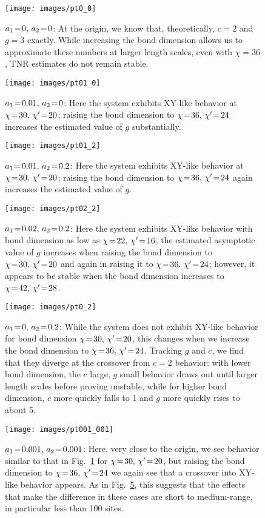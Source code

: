 \documentclass[aps,prb,letterpaper,superscriptaddress,twocolumn,showpacs,floatfix,10pt]{revtex4-1}
\begin{document}
\begin{figure}
\texttt{[image: images/pt0\_0]}
\caption{$a_1\nobreak\!=\nobreak\!0, \,a_2\nobreak\!=\nobreak\!0$: At the origin, we know that, theoretically,
$c=2$ and $g=3$
exactly. While increasing the bond dimension allows us to approximate these
numbers at larger length scales, even with $\chi=36$, TNR
estimates do not remain stable.}
\label{fig:comp0_0}
\end{figure}
\begin{figure}
\texttt{[image: images/pt01\_0]}
\caption{$a_1\nobreak\!=\nobreak\!0.01, \,a_2\nobreak\!=\nobreak\!0$: Here the system exhibits XY-like behavior at
$\chi\nobreak\!=\nobreak\!30, \,\chi'\nobreak\!=\nobreak\!20$; raising the bond dimension to $\chi\nobreak\!=\nobreak\!36, \,\chi'\nobreak\!=\nobreak\!24$ increases
the estimated value of $g$ substantially.}
\label{fig:comp01_0}
\end{figure}
\begin{figure}
\texttt{[image: images/pt01\_2]}
\caption{$a_1\nobreak\!=\nobreak\!0.01, \,a_2\nobreak\!=\nobreak\!0.2$: Here the system exhibits XY-like behavior at
$\chi\nobreak\!=\nobreak\!30, \,\chi'\nobreak\!=\nobreak\!20$; raising the bond dimension to $\chi\nobreak\!=\nobreak\!36, \,\chi'\nobreak\!=\nobreak\!24$ again
increases the estimated value of $g$.}
\label{fig:comp01_2}
\end{figure}
\begin{figure}
\texttt{[image: images/pt02\_2]}
\caption{$a_1\nobreak\!=\nobreak\!0.02, \,a_2\nobreak\!=\nobreak\!0.2$: Here the system exhibits XY-like behavior with
bond dimension as low as $\chi\nobreak\!=\nobreak\!22, \,\chi'\nobreak\!=\nobreak\!16$; the estimated asymptotic value
of $g$ increases when raising the bond dimension to $\chi\nobreak\!=\nobreak\!30, \,\chi'\nobreak\!=\nobreak\!20$ and again
in raising it to $\chi\nobreak\!=\nobreak\!36, \,\chi'\nobreak\!=\nobreak\!24$; however, it appears to be stable when the
bond dimension increases to $\chi\nobreak\!=\nobreak\!42, \,\chi'\nobreak\!=\nobreak\!28$.}
\label{fig:comp02_2}
\end{figure}
\begin{figure}
\texttt{[image: images/pt0\_2]}
\caption{$a_1\nobreak\!=\nobreak\!0, \,a_2\nobreak\!=\nobreak\!0.2$: While the system does not exhibit XY-like behavior
for bond dimension $\chi\nobreak\!=\nobreak\!30, \,\chi'\nobreak\!=\nobreak\!20$, this changes when we increase the bond
dimension to $\chi\nobreak\!=\nobreak\!36, \,\chi'\nobreak\!=\nobreak\!24$. Tracking $g$ and $c$, we find that they
diverge at the crossover from $c=2$ behavior: with lower bond dimension, the
$c$ large, $g$ small behavior draws out until larger length scales before
proving unstable, while for higher bond dimension, $c$ more quickly falls to 1
and $g$ more quickly rises to about 5.}
\label{fig:comp0_2}
\end{figure}
\begin{figure}
\texttt{[image: images/pt001\_001]}
\caption{$a_1\nobreak\!=\nobreak\!0.001, \,a_2\nobreak\!=\nobreak\!0.001$: Here, very close to the origin, we see behavior
similar to that in Fig.~\ref{fig:comp0_0} for $\chi\nobreak\!=\nobreak\!30, \,\chi'\nobreak\!=\nobreak\!20$, but raising
the bond dimension to $\chi\nobreak\!=\nobreak\!36, \,\chi'\nobreak\!=\nobreak\!24$ we again see that a crossover into
XY-like behavior appears. As in Fig.~\ref{fig:comp0_2}, this suggests that the
effects that make the difference in these cases are short to medium-range, in
particular less than 100 sites.}
\label{fig:comp001_001}
\end{figure}
\end{document}
